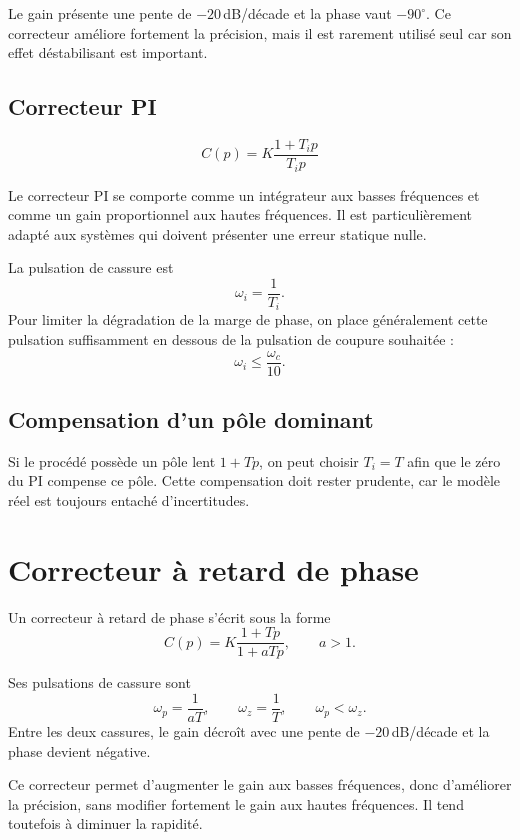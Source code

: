 \TLBodeCorrecteurI[1]

Le gain présente une pente de $-20$\,dB/décade et la phase vaut $-90^\circ$.
Ce correcteur améliore fortement la précision, mais il est rarement utilisé seul
car son effet déstabilisant est important.

\subsection{Correcteur PI}

\[
\boxed{C(p)=K\frac{1+T_i p}{T_i p}}
\]

\TLBodeCorrecteurPI[1][1]

Le correcteur PI se comporte comme un intégrateur aux basses fréquences et comme
un gain proportionnel aux hautes fréquences. Il est particulièrement adapté aux
systèmes qui doivent présenter une erreur statique nulle.

La pulsation de cassure est
\[
\omega_i=\frac{1}{T_i}.
\]
Pour limiter la dégradation de la marge de phase, on place généralement cette
pulsation suffisamment en dessous de la pulsation de coupure souhaitée :
\[
\omega_i\leq \frac{\omega_c}{10}.
\]

\subsection{Compensation d'un pôle dominant}

Si le procédé possède un pôle lent $1+Tp$, on peut choisir $T_i=T$ afin que le
zéro du PI compense ce pôle. Cette compensation doit rester prudente, car le
modèle réel est toujours entaché d'incertitudes.

\section{Correcteur à retard de phase}\label{sec:corr-retard}

Un correcteur à retard de phase s'écrit sous la forme
\[
\boxed{C(p)=K\frac{1+Tp}{1+aTp}},\qquad a>1.
\]

\TLBodeRetardPhase[1][10][1]

Ses pulsations de cassure sont
\[
\omega_p=\frac{1}{aT},\qquad \omega_z=\frac{1}{T},
\qquad \omega_p<\omega_z.
\]
Entre les deux cassures, le gain décroît avec une pente de $-20$\,dB/décade et la
phase devient négative.

Ce correcteur permet d'augmenter le gain aux basses fréquences, donc d'améliorer
la précision, sans modifier fortement le gain aux hautes fréquences. Il tend
toutefois à diminuer la rapidité.

